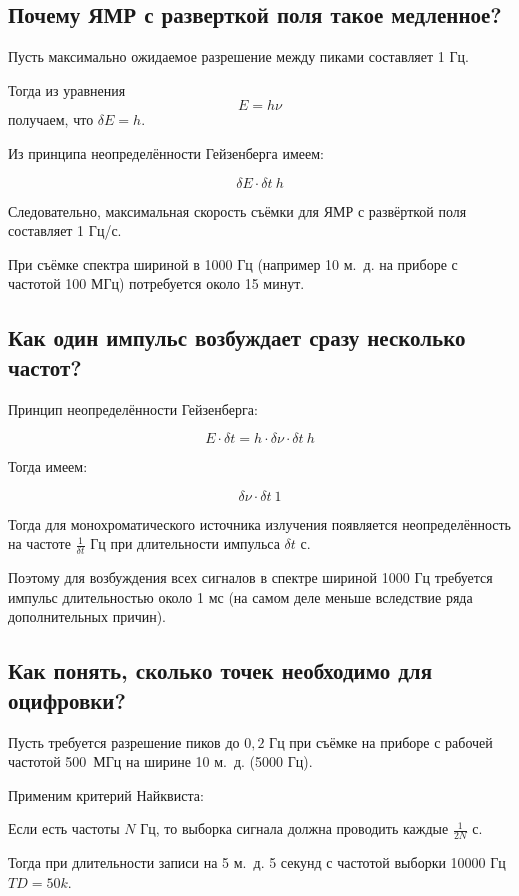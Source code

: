 \documentclass[12pt, a4paper, oneside]{article}	%
\begin{document}
	\subsection
		{Почему ЯМР с разверткой поля такое медленное?}

		Пусть максимально ожидаемое разрешение между пиками составляет 1 Гц.

		Тогда из уравнения 
		$$E = h \nu$$
		получаем, что $\delta E = h$.

		Из принципа неопределённости Гейзенберга имеем:

		$$\delta E \cdot \delta t ~ h$$

		Следовательно, максимальная скорость съёмки для ЯМР с развёрткой поля составляет 1 Гц{\slash}с.

		При съёмке спектра шириной в 1000 Гц (например 10 м.~д. на приборе с частотой 100 МГц)
		потребуется около 15 минут.

	\subsection {Как один импульс возбуждает сразу несколько частот?}
		
		Принцип неопределённости Гейзенберга:

		$$E \cdot \delta t = h \cdot \delta \nu \cdot \delta t ~ h$$

		Тогда имеем:

		$$\delta \nu \cdot \delta t ~ 1$$

		Тогда для монохроматического источника излучения появляется неопределённость на частоте
		$\frac{1}{\delta t}$ Гц при длительности импульса $\delta t$ с.

		Поэтому для возбуждения всех сигналов в спектре шириной 1000 Гц требуется импульс
		длительностью около 1 мс (на самом деле меньше вследствие ряда дополнительных причин).

	\subsection {Как понять, сколько точек необходимо для оцифровки?}

		Пусть требуется разрешение пиков до $0{,}2$ Гц при съёмке на приборе с рабочей частотой
		500~МГц на ширине 10 м.~д. (5000 Гц).

		Применим критерий Найквиста:

		Если есть частоты $N$ Гц, то выборка сигнала должна проводить каждые $\frac{1}{2N}$ с.

		Тогда при длительности записи на 5 м.~д. 5 секунд с частотой выборки 10000 Гц $TD = 50k$.
\end{document}
